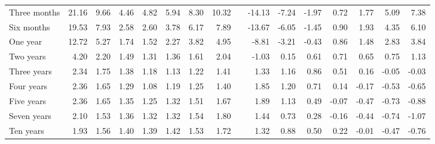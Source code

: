 \begin{sidewaystable}
\begin{tabular}{lrrrrrrrlrrrrrrr}
Three months	&	21.16  & 9.66  &  4.46 & 4.82  & 5.94&8.30  & 10.32 && -14.13  & -7.24&  -1.97&  0.72 &   1.77&  5.09&   7.38\\
Six months	&	19.53  & 7.93  &  2.58 & 2.60  & 3.78&6.17  &  7.89 && -13.67  & -6.05&  -1.45&  0.90 &   1.93&  4.35&   6.10\\
One year	&	12.72  & 5.27  &  1.74 & 1.52  & 2.27&3.82  &  4.95 && -8.81   &-3.21 & -0.43 &  0.86 &  1.48 & 2.83 &  3.84\\
Two years	&	 4.20  & 2.20  &  1.49 & 1.31  & 1.36&1.61  &  2.04 && -1.03   & 0.15 &  0.61 &  0.71 &  0.65 & 0.75 &  1.13\\
Three years	&	 2.34  & 1.75  &  1.38 & 1.18  & 1.13&1.22  &  1.41 &&  1.33   & 1.16 &  0.86 &  0.51 &  0.16 &-0.05 & -0.03\\
Four years	&	 2.36  & 1.65  &  1.29 & 1.08  & 1.19&1.25  &  1.40 &&  1.85   & 1.20 &  0.71 &  0.14 & -0.17 &-0.53 & -0.65\\
Five years	&	 2.36  & 1.65  &  1.35 & 1.25  & 1.32&1.51  &  1.67 &&  1.89   & 1.13 &  0.49 & -0.07 & -0.47 &-0.73 & -0.88\\
Seven years	&	 2.10  & 1.53  &  1.36 & 1.32  & 1.32&1.54  &  1.80	&&  1.44   & 0.73 &  0.28 & -0.16 & -0.44 &-0.74 & -1.07\\
Ten years   &  1.93   & 1.56  &  1.40 & 1.39  & 1.42&1.53  &  1.72 &&  1.32   &0.88  &  0.50 &  0.22 & -0.01 & -0.47& -0.76\\ \bottomrule
\end{tabular}\\
\end{sidewaystable}